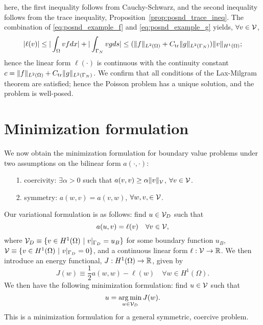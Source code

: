 here, the first inequality follows from Cauchy-Schwarz, and the second inequality follows from the trace inequality, Proposition~\ref{prop:posnd_trace_ineq}. The combination of \eqref{eq:posnd_example_f} and \eqref{eq:posnd_example_g} yields, $\forall v \in \mathcal{V}$,
\begin{equation*}
  | \ell(v) | \leq | \int_\Omega vf dx | + |\int_{\Gamma_N} vg ds|
  \leq  (\| f \|_{L^2(\Omega)} + C_{\rm tr} \| g \|_{L^2(\Gamma_N)}) \| v \|_{H^1(\Omega)};
\end{equation*}
hence the linear form $\ell(\cdot)$ is continuous with the continuity constant $c =  \| f \|_{L^2(\Omega)} + C_{\rm tr} \| g \|_{L^2(\Gamma_N)}$.  We confirm that all conditions of the Lax-Milgram theorem are satisfied; hence the Poisson problem has a unique solution, and the problem is well-posed.

\section{Minimization formulation}
We now obtain the minimization formulation for boundary value problems under two assumptions on the bilinear form $a(\cdot,\cdot)$:
\begin{itemize}
\item[1.] coercivity: $\exists \alpha > 0$ such that $a(v,v) \geq \alpha\| v \|_{\mathcal{V}}$, $\forall v \in \mathcal{V}$.
\item[2.] symmetry: $a(w,v) = a(v,w)$, $\forall w,v, \in \mathcal{V}$.
\end{itemize}
Our variational formulation is as follows: find $u \in \mathcal{V}_D$ such that
\begin{equation}
  a(u,v) = \ell(v) \quad \forall v \in \mathcal{V},
  \label{eq:posnd_energy_var}
\end{equation}
where $\calV_D \equiv  \{ v \in H^1(\Omega) \ | \ v|_{\Gamma_D} = u_B\}$ for some boundary function $u_B$, $ \calV \equiv \{ v \in H^1(\Omega) \ | \ v|_{\Gamma_D} = 0 \}$, and a continuous linear form $\ell: \mathcal{V} \to \mathbb{R}$.
  We then introduce an energy functional, $J: H^1(\Omega) \to \mathbb{R}$, given by
\begin{equation}
  J(w) \equiv \frac{1}{2} a(w,w) - \ell(w) \quad \forall w \in H^1(\Omega).
  \label{eq:posnd_energy_fun}
\end{equation}
 We then have the following minimization formulation: find $u \in \mathcal{V}$ such that
\begin{equation}
  u = \operatorname*{arg\,min}_{w \in \mathcal{V}_D} J(w).
  \label{eq:posnd_energy_min}
\end{equation}
This is a minimization formulation for a general symmetric, coercive problem.

